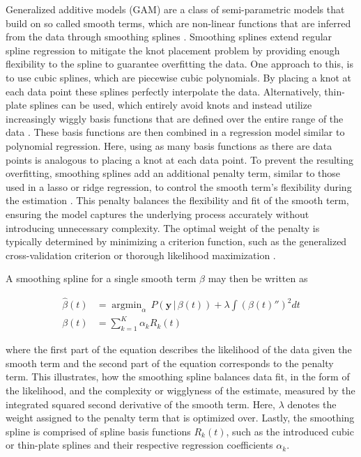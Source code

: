 \documentclass[man, floatsintext]{apa7}
\DeclareMathOperator*{\argmin}{argmin}
\begin{document}
Generalized additive models (GAM) are a class of semi-parametric models that
build on so called smooth terms, which are non-linear functions that are
inferred from the data through smoothing splines
\parencite{wood_generalized_2006, wood_inference_2020,
  hastie_generalized_1999}. Smoothing splines extend regular spline regression
to
mitigate the knot placement problem by providing enough flexibility to the
spline to guarantee overfitting the data. One approach to this, is to use cubic
splines, which are piecewise cubic polynomials. By placing a knot at each data
point these splines perfectly interpolate the data. Alternatively, thin-plate
splines can be used, which entirely avoid knots and instead utilize
increasingly wiggly basis functions that are defined over the entire range of
the data \parencite{wood_thin_2003}. These basis functions are then combined in
a regression model similar to polynomial regression. Here, using as many basis
functions as there are data points is analogous to placing a knot at each data
point. To prevent the resulting overfitting, smoothing splines add an
additional penalty term, similar to those used in a lasso or ridge regression,
to control the smooth term's flexibility during the estimation
\parencite{gu_smoothing_2013, wahba_spline_1980}. This penalty balances the
flexibility and fit of the smooth term, ensuring the model captures the
underlying process accurately without introducing unnecessary complexity. The
optimal weight of the penalty is typically determined by minimizing a criterion
function, such as the generalized cross-validation criterion or thorough
likelihood maximization \parencite{wood_generalized_2006,
  golub_generalized_1997}.

A smoothing spline for a single smooth term $\beta$ may then be written as

\begin{equation}
  \begin{aligned}
    \hat{\beta}(t) & = \argmin_\alpha \, P(\textbf{y} \, | \, \beta(t)) +
    \lambda \int {(\beta(t)'')}^2 dt                                      \\
    \beta(t)       & = \sum^K_{k = 1} \alpha_k R_k(t)
  \end{aligned}
\end{equation}

\noindent where the first part of the equation describes the likelihood
of the data given the smooth term and the second part of the equation
corresponds to the penalty term. This illustrates, how the smoothing
spline balances data fit, in the form of the likelihood, and the complexity or
wigglyness of the estimate, measured by the integrated squared second
derivative of the smooth term. Here, $\lambda$ denotes the weight assigned to
the penalty term that is optimized over. Lastly, the smoothing spline is
comprised of spline basis functions $R_k(t)$, such as the introduced cubic or
thin-plate splines and their respective regression coefficients $\alpha_k$.
\end{document}
